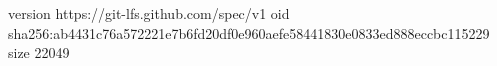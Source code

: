 version https://git-lfs.github.com/spec/v1
oid sha256:ab4431c76a572221e7b6fd20df0e960aefe58441830e0833ed888eccbc115229
size 22049
